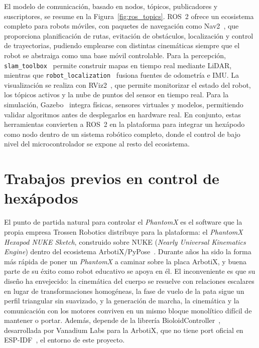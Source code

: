 El modelo de comunicación, basado en nodos, tópicos, publicadores y
suscriptores, se resume en la Figura~\ref{fig:ros_topics}. ROS~2 ofrece un ecosistema completo para robots móviles, con paquetes de navegación como Nav2~\cite{nav2}, que proporciona planificación de rutas,
evitación de obstáculos, localización y control de trayectorias, pudiendo
emplearse con distintas cinemáticas siempre que el robot se abstraiga como una
base móvil controlable. Para la percepción,
\texttt{slam\_toolbox}~\cite{slam_toolbox} permite
construir mapas en tiempo real mediante LiDAR, mientras que
\texttt{robot\_localization}~\cite{robot_localization} fusiona fuentes de
odometría e IMU. La visualización se realiza con RViz2~\cite{rviz2}, que
permite monitorizar el estado del robot, los tópicos activos y la nube de
puntos del sensor en tiempo real. Para la simulación, Gazebo~\cite{gazebo}
integra físicas, sensores virtuales y modelos, permitiendo validar algoritmos
antes de desplegarlos en hardware real. En conjunto, estas herramientas
convierten a ROS~2 en la plataforma para integrar un hexápodo como
nodo dentro de un sistema robótico completo, donde el control de bajo nivel
del microcontrolador se expone al resto del ecosistema.


\section{Trabajos previos en control de hexápodos}

El punto de partida natural para controlar el \textit{PhantomX} es el software
que la propia empresa Trossen Robotics distribuye para la plataforma: el \textit{PhantomX
Hexapod NUKE Sketch}, construido sobre NUKE (\textit{Nearly Universal Kinematics
Engine}) dentro del ecosistema ArbotiX/PyPose~\cite{nuke_hexapod}. Durante años ha
sido la forma más rápida de poner un \textit{PhantomX} a caminar sobre la placa
ArbotiX, y buena parte de su éxito como robot educativo se apoya en él. El
inconveniente es que su diseño ha envejecido: la cinemática del cuerpo se resuelve
con relaciones escalares en lugar de transformaciones homogéneas, la fase de vuelo
de la pata sigue un perfil triangular sin suavizado, y la generación de marcha, la
cinemática y la comunicación con los motores conviven en un mismo bloque
monolítico difícil de mantener o portar. Además, depende de la librería
BioloidController~\cite{bioloid_controller}, desarrollada por Vanadium Labs para la
ArbotiX, que no tiene port oficial en ESP-IDF~\cite{espidf}, el entorno de este proyecto.

